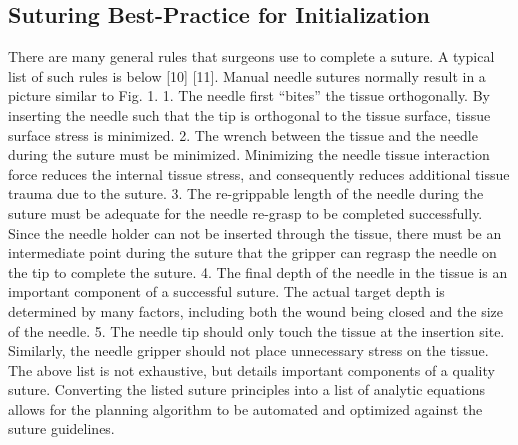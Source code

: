 \subsection{Suturing Best-Practice for Initialization}
There are many general rules that surgeons use to complete
a suture. A typical list of such rules is below [10] [11].
Manual needle sutures normally result in a picture similar to
Fig. 1.
1. The needle first “bites” the tissue orthogonally. By
inserting the needle such that the tip is orthogonal to
the tissue surface, tissue surface stress is minimized.
2. The wrench between the tissue and the needle during
the suture must be minimized. Minimizing the needle
tissue interaction force reduces the internal tissue stress,
and consequently reduces additional tissue trauma due
to the suture.
3. The re-grippable length of the needle during the
suture must be adequate for the needle re-grasp to be
completed successfully. Since the needle holder can
not be inserted through the tissue, there must be an
intermediate point during the suture that the gripper can
regrasp the needle on the tip to complete the suture.
4. The final depth of the needle in the tissue is an
important component of a successful suture. The actual
target depth is determined by many factors, including
both the wound being closed and the size of the needle.
5. The needle tip should only touch the tissue at the
insertion site. Similarly, the needle gripper should not
place unnecessary stress on the tissue.
The above list is not exhaustive, but details important components
of a quality suture.
Converting the listed suture principles into a list of analytic
equations allows for the planning algorithm to be automated
and optimized against the suture guidelines.